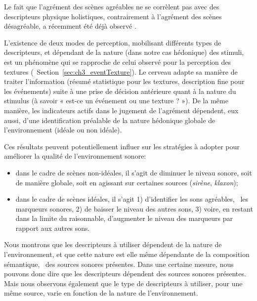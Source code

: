 Le fait que l'agrément des scènes agréables ne se corrèlent pas avec des descripteurs physique holistiques, contrairement à l'agrément des scènes désagréable, a récemment été déjà observé \citep{gozalo2015relationship}.

L'existence de deux modes de perception, mobilisant différents types de descripteurs, et dépendant de la nature (dans notre cas hédonique) des stimuli, est un phénomène qui se rapproche de celui observé pour la perception des textures (\cf~Section~\ref{sec:ch3_eventTexture}). Le cerveau adapte sa manière de traiter l'information (résumé statistique pour les textures, description fine pour les événements) suite à une prise de décision antérieure quant à la nature du stimulus (à savoir « est-ce un événement ou une texture ? »). De la même manière, les indicateurs actifs dans le jugement de l'agrément dépendent, eux aussi, d'une identification préalable de la nature hédonique globale de l'environnement (idéale ou non idéale).

Ces résultats peuvent potentiellement influer sur les stratégies à adopter pour améliorer la qualité de l’environnement sonore:

\begin{itemize}
\item dans le cadre de scènes non-idéales, il s'agit de diminuer le niveau sonore, soit de manière globale, soit en agissant sur certaines sources (\emph{sirène}, \emph{klaxon});
\item dans le cadre de scènes idéales, il s'agit 1) d'identifier les sons agréables, \ie~les marqueurs sonores, 2) de baisser le niveau des autres sons, 3) voire, en restant dans la limite du raisonnable, d'augmenter le niveau des marqueurs par rapport aux autres sons.
\end{itemize}

Nous montrons que les descripteurs à utiliser dépendent de la nature de l'environnement, et que cette nature est elle même dépendante de la composition sémantique, \ie~des sources sonores présentes. Dans une certaine mesure, nous pouvons donc dire que les descripteurs dépendent des sources sonores présentes. Mais nous observons également que le type de descripteurs à utiliser, pour une même source, varie en fonction de la nature de l'environnement.


